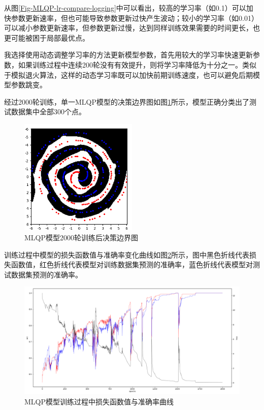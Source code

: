 \documentclass[12pt, a4paper, oneside]{ctexart}
\begin{document}
    从图\ref{Fig-MLQP-lr-compare-logging}中可以看出，较高的学习率（如0.1）可以加快参数更新速率，但也可能导致参数更新过快产生波动；较小的学习率（如0.01）可以减小参数更新速率，但参数更新过慢，达到同样训练效果需要的时间更长，也更可能被困于局部最优点。

    我选择使用动态调整学习率的方法更新模型参数，首先用较大的学习率快速更新参数，如果训练过程中连续200轮没有有效提升，则将学习率降低为十分之一。类似于模拟退火算法，这样的动态学习率既可以加快前期训练速度，也可以避免后期模型参数跳变。




    经过2000轮训练，单一MLQP模型的决策边界图如图\ref{Fig-MLQP-boundary}所示，模型正确分类出了测试数据集中全部300个点。

    \begin{figure}[htbp]
        \centering
        \includegraphics[width=0.5\textwidth]{figures/MLQP_boundary.png}
        \caption{MLQP模型2000轮训练后决策边界图}
        \label{Fig-MLQP-boundary}
    \end{figure}

    训练过程中模型的损失函数值与准确率变化曲线如图\ref{Fig-MLQP-logging}所示，图中黑色折线代表损失函数值，红色折线代表模型对训练数据集预测的准确率，蓝色折线代表模型对测试数据集预测的准确率。

    \begin{figure}[htbp]
        \centering
        \includegraphics[width=1.0\textwidth]{figures/MLQP_logging.png}
        \caption{MLQP模型训练过程中损失函数值与准确率曲线}
        \label{Fig-MLQP-logging}
    \end{figure}
\end{document}
